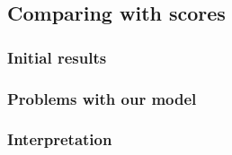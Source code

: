 \documentclass[
  a4paper]{article}
\begin{document}
\hypertarget{comparing-with-scores}{%
\subsection{Comparing with scores}\label{comparing-with-scores}}

\hypertarget{initial-results}{%
\subsubsection{Initial results}\label{initial-results}}

\hypertarget{problems-with-our-model}{%
\subsubsection{Problems with our model}\label{problems-with-our-model}}

\hypertarget{interpretation}{%
\subsubsection{Interpretation}\label{interpretation}}


\printbibliography[title=Conclusion]
\end{document}
